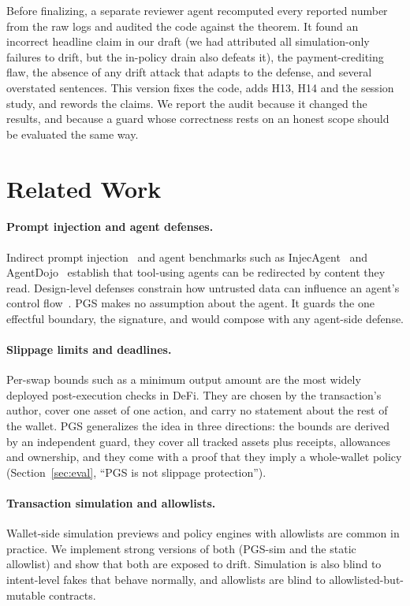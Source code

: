 \documentclass[11pt]{article}
\newcommand{\pgs}{\textsc{PGS}}
\begin{document}
Before finalizing, a separate reviewer agent recomputed every reported number from the raw logs and audited the code against the theorem. It found an incorrect headline claim in our draft (we had attributed all simulation-only failures to drift, but the in-policy drain also defeats it), the payment-crediting flaw, the absence of any drift attack that adapts to the defense, and several overstated sentences. This version fixes the code, adds H13, H14 and the session study, and rewords the claims. We report the audit because it changed the results, and because a guard whose correctness rests on an honest scope should be evaluated the same way.

\section{Related Work}
\label{sec:related}
\paragraph{Prompt injection and agent defenses.} Indirect prompt injection~\cite{greshake2023not} and agent benchmarks such as InjecAgent~\cite{zhan2024injecagent} and AgentDojo~\cite{debenedetti2024agentdojo} establish that tool-using agents can be redirected by content they read. Design-level defenses constrain how untrusted data can influence an agent's control flow~\cite{debenedetti2025camel}. \pgs{} makes no assumption about the agent. It guards the one effectful boundary, the signature, and would compose with any agent-side defense.

\paragraph{Slippage limits and deadlines.} Per-swap bounds such as a minimum output amount are the most widely deployed post-execution checks in DeFi. They are chosen by the transaction's author, cover one asset of one action, and carry no statement about the rest of the wallet. \pgs{} generalizes the idea in three directions: the bounds are derived by an independent guard, they cover all tracked assets plus receipts, allowances and ownership, and they come with a proof that they imply a whole-wallet policy (Section~\ref{sec:eval}, ``\pgs{} is not slippage protection'').

\paragraph{Transaction simulation and allowlists.} Wallet-side simulation previews and policy engines with allowlists are common in practice. We implement strong versions of both (\pgs{}-sim and the static allowlist) and show that both are exposed to drift. Simulation is also blind to intent-level fakes that behave normally, and allowlists are blind to allowlisted-but-mutable contracts.
\end{document}
